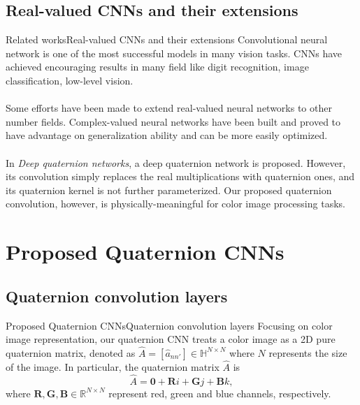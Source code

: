 \documentclass{beamer}
\begin{document}
\subsection{Real-valued CNNs and their extensions}
\begin{frame}{Related works}{Real-valued CNNs and their extensions}
Convolutional neural network is one of the most successful models in many vision tasks. CNNs have achieved encouraging results in many field like digit recognition, image classification, low-level vision.
\\~\\
Some efforts have been made to extend real-valued neural networks to other number fields. Complex-valued neural networks have been built and proved to have advantage on generalization ability and can be more easily optimized.
\\~\\
In \emph{Deep quaternion networks}, a deep quaternion
network is proposed. However, its convolution simply replaces the real multiplications with quaternion ones, and its quaternion kernel is not further parameterized. Our proposed quaternion convolution, however, is physically-meaningful
for color image processing tasks.

\end{frame}

\section{Proposed Quaternion CNNs}
\subsection{Quaternion convolution layers}
\begin{frame}{Proposed Quaternion CNNs}{Quaternion convolution layers}
Focusing on color image representation, our quaternion CNN treats a color image as a 2D pure quaternion matrix, denoted as $\hat{A}=[\hat{a}_{nn'}]\in \mathbb{H}^{N\times N}$ where $N$ represents the size of the image. In particular, the quaternion matrix $\hat{A}$ is 
\begin{equation}
    \hat{A}=\mathbf{0}+\textbf{R}i+\textbf{G}j+\textbf{B}k,
\end{equation}
where $\textbf{R},\textbf{G},\textbf{B}\in \mathbb{R}^{N\times N}$ represent red, green and blue channels, respectively.

\end{frame}
\end{document}
